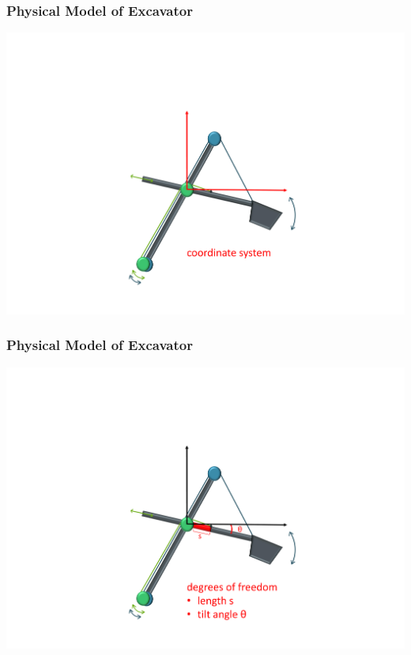 \documentclass{beamer}
\begin{document}
\begin{frame}
	\frametitle{Physical Model of Excavator}
	
	
	
	\includegraphics[trim=22cm 5cm 2cm 23cm, clip=true, width=\linewidth]{Exc/Excavator_coordinates2}
	
\end{frame}

\begin{frame}
	\frametitle{Physical Model of Excavator}
	
	
	\includegraphics[trim=22cm 5cm 2cm 23cm, clip=true, width=\linewidth]{Exc/Excavator_dof2}
	
	
\end{frame}
\end{document}
